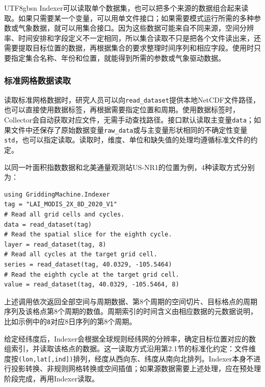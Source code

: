 \documentclass[numdoi]{chinese}
\begin{document}
\begin{CJK}{UTF8}{gbsn}
Indexer可以读取单个数据集，也可以把多个来源的数据组合起来读取。如果只需要某一个变量，可以用单文件接口；如果需要模式运行所需的多种参数或气象数据，就可以用集合接口。因为这些数据可能来自不同来源，空间分辨率、\allowbreak{}时间安排和字段定义不一定相同，所以集合读取不只是把各个文件读出来，还需要提取目标位置的数据，再根据集合的要求整理时间序列和相应字段。使用时只要指定集合名称、\allowbreak{}年份和位置，就能得到所需的参数或气象驱动数据。

\subsubsection{标准网格数据读取}

读取标准网格数据时，研究人员可以向\nolinkurl{read_dataset}提供本地NetCDF文件路径，也可以直接使用数据标签，再根据需要指定位置和周期。使用数据标签时，Collector会自动获取对应文件，无需手动查找路径。接口默认读取主变量\nolinkurl{data}；如果文件中还保存了原始数据变量\nolinkurl{raw_data}或与主变量形状相同的不确定性变量\nolinkurl{std}，也可以指定读取。读取时，维度、\allowbreak{}单位和缺失值的处理均遵循标准文件的约定。

以同一叶面积指数数据和北美通量观测站US-NR1的位置为例，4种读取方式分别为：

\begingroup\singlespacing
\begin{Verbatim}[fontsize=\small,frame=single,framesep=5pt]
using GriddingMachine.Indexer
tag = "LAI_MODIS_2X_8D_2020_V1"
# Read all grid cells and cycles.
data = read_dataset(tag)
# Read the spatial slice for the eighth cycle.
layer = read_dataset(tag, 8)
# Read all cycles at the target grid cell.
series = read_dataset(tag, 40.0329, -105.5464)
# Read the eighth cycle at the target grid cell.
value = read_dataset(tag, 40.0329, -105.5464, 8)
\end{Verbatim}
\endgroup

上述调用依次返回全部空间与周期数据、\allowbreak{}第8个周期的空间切片、\allowbreak{}目标格点的周期序列及该格点第8个周期的数值。周期索引的时间含义由相应数据的元数据说明，比如示例中的\nolinkurl{8}对应8日序列的第8个周期。

给定经纬度后，Indexer会根据全球规则经纬网的分辨率，确定目标位置对应的数组索引，并读取该格点的数据。这一读取方式沿用第2.1节的标准化约定：文件维度按\nolinkurl{(lon,lat[,ind])}排列，经度从西向东、\allowbreak{}纬度从南向北排列。Indexer本身不进行投影转换、\allowbreak{}非规则网格转换或空间插值；如果源数据需要上述处理，应在预处理阶段完成，再用Indexer读取。


\end{CJK}
\end{document}
